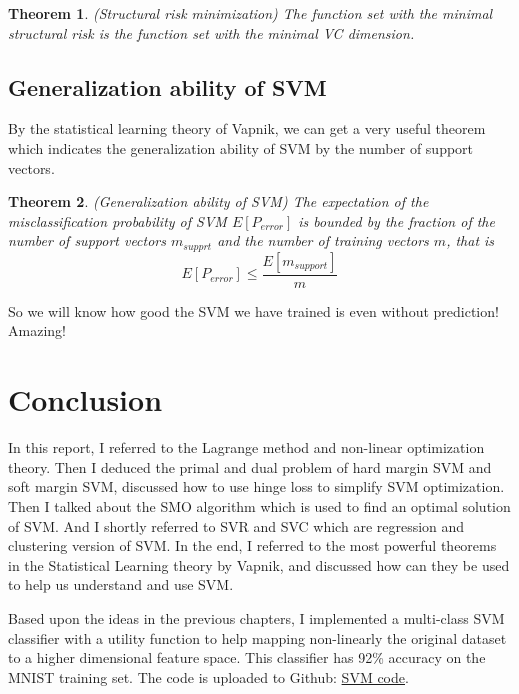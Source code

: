 \documentclass[a4paper]{report}
\newtheorem{theorem}{Theorem}[section]
\begin{document}
\begin{theorem}
    (Structural risk minimization) The function set with the minimal structural risk is the function set with the minimal VC dimension.
\end{theorem}

\section{Generalization ability of SVM}

By the statistical learning theory of Vapnik, we can get a very useful theorem which indicates the generalization ability of SVM by the number of support vectors.

\begin{theorem}
    (Generalization ability of SVM\cite{cortes1995support}) The expectation of the misclassification probability of SVM $E[P_{error}]$ is bounded by the fraction of the number of support vectors $m_{supprt}$ and the number of training vectors $m$, that is
    \[
        E[P_{error}]\leq\frac{E[m_{support}]}{m}
    \]
\end{theorem}

So we will know how good the SVM we have trained is even without prediction! Amazing!

\chapter{Conclusion}

In this report, I referred to the Lagrange method and non-linear optimization theory. Then I deduced the primal and dual problem of hard margin SVM and soft margin SVM, discussed how to use hinge loss to simplify SVM optimization. Then I talked about the SMO algorithm which is used to find an optimal solution of SVM. And I shortly referred to SVR and SVC which are regression and clustering version of SVM. In the end, I referred to the most powerful theorems in the Statistical
Learning theory by Vapnik, and discussed how can they be used to help us understand and use SVM. 

Based upon the ideas in the previous chapters, I implemented a multi-class SVM classifier with a utility function to help mapping non-linearly the original dataset to a higher dimensional feature space. This classifier has 92\% accuracy on the MNIST training set. The code is uploaded to Github: \href{https://github.com/chaihahaha/Multiclass-Support-Vector-Machine-Tensorflow}{SVM code}.

{}

\end{document}
